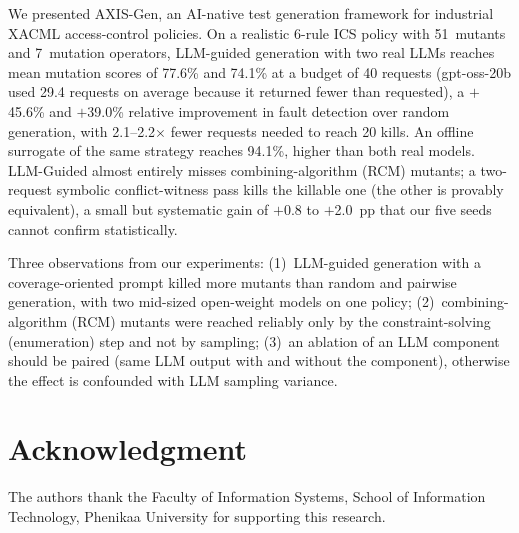 \documentclass[conference]{IEEEtran}
\begin{document}
We presented AXIS-Gen, an AI-native test generation framework for industrial
XACML access-control policies. On a realistic 6-rule ICS policy with 51~mutants
and 7~mutation operators, LLM-guided generation with two real LLMs reaches
mean mutation scores of 77.6\% and 74.1\% at a budget of 40 requests
(gpt-oss-20b used 29.4 requests on average because it returned fewer than
requested), a $+$45.6\% and $+$39.0\% relative improvement in fault detection
over random generation, with 2.1--2.2$\times$ fewer requests needed to reach 20
kills. An
offline surrogate of the same strategy reaches 94.1\%, higher than both real
models. LLM-Guided almost entirely misses combining-algorithm (RCM) mutants; a two-request symbolic
conflict-witness pass kills the killable one (the other is provably
equivalent), a small but systematic gain of $+$0.8 to $+$2.0~pp that our five
seeds cannot confirm statistically.

Three observations from our experiments: (1)~LLM-guided generation with a
coverage-oriented prompt killed more mutants than random and pairwise
generation, with two mid-sized open-weight models on one policy;
(2)~combining-algorithm (RCM) mutants were reached reliably only by the
constraint-solving (enumeration) step and not by sampling; (3)~an ablation of
an LLM component should be paired (same LLM output with and without the
component), otherwise the effect is confounded with LLM sampling variance.

\section*{Acknowledgment}

The authors thank the Faculty of Information Systems, School of Information
Technology, Phenikaa University for supporting this research.
\end{document}
